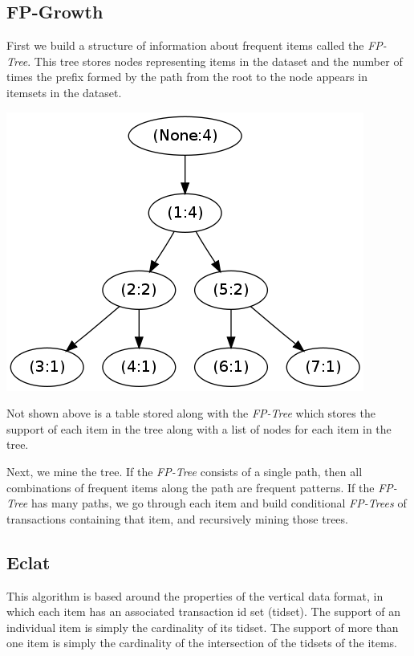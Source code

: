 \documentclass[11pt]{article}
\begin{document}
\begin{multicols}{2}
\subsection{FP-Growth}

First we build a structure of information about frequent items called
the \emph{FP-Tree}.  This tree stores nodes representing items in the
dataset and the number of times the prefix formed by the path from the
root to the node appears in itemsets in the dataset.

\begin{center}
\includegraphics[scale=0.5]{../figs/tiny.png}
\end{center}

Not shown above is a table stored along with the \emph{FP-Tree} which
stores the support of each item in the tree along with a list of nodes
for each item in the tree.

Next, we mine the tree.  If the \emph{FP-Tree} consists of a single
path, then all combinations of frequent items along the path are
frequent patterns.  If the \emph{FP-Tree} has many paths, we go
through each item and build conditional \emph{FP-Trees} of
transactions containing that item, and recursively mining those trees.

\subsection{Eclat}

This algorithm is based around the properties of the vertical data
format, in which each item has an associated transaction id set
(tidset).  The support of an individual item is simply the cardinality
of its tidset.  The support of more than one item is simply the
cardinality of the intersection of the tidsets of the items.


\end{multicols}
\end{document}
